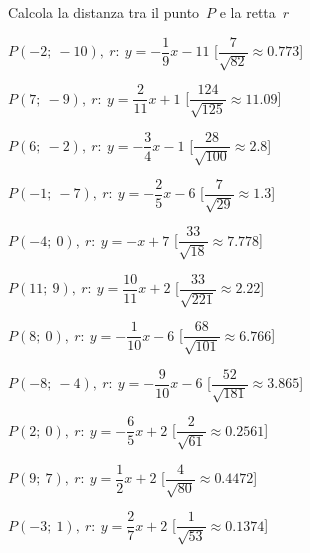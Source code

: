 \begin{esercizio}\label{ese:}
 Calcola la distanza tra il punto~\(P\) e la retta~\(r\)
 \begin{enumeratea}
  \item  \(P(-2;~-10),~r:~y = -\dfrac{1}{9} x -11\) \hfill 
   [\(\dfrac{7}{\sqrt{82}}\approx 0.773\)]
  \item  \(P(7;~-9),~r:~y = \dfrac{2}{11} x +1\) \hfill 
   [\(\dfrac{124}{\sqrt{125}}\approx 11.09\)]
  \item  \(P(6;~-2),~r:~y = -\dfrac{3}{4} x -1\) \hfill 
   [\(\dfrac{28}{\sqrt{100}}\approx   2.8\)]
  \item  \(P(-1;~-7),~r:~y = -\dfrac{2}{5} x -6\) \hfill 
   [\(\dfrac{7}{\sqrt{29}}\approx   1.3\)]
  \item  \(P(-4;~0),~r:~y = - x +7\) \hfill 
   [\(\dfrac{33}{\sqrt{18}}\approx 7.778\)]
  \item  \(P(11;~9),~r:~y = \dfrac{10}{11} x +2\) \hfill 
   [\(\dfrac{33}{\sqrt{221}}\approx  2.22\)]
  \item  \(P(8;~0),~r:~y = -\dfrac{1}{10} x -6\) \hfill 
   [\(\dfrac{68}{\sqrt{101}}\approx 6.766\)]
  \item  \(P(-8;~-4),~r:~y = -\dfrac{9}{10} x -6\) \hfill 
   [\(\dfrac{52}{\sqrt{181}}\approx 3.865\)]
  \item  \(P(2;~0),~r:~y = -\dfrac{6}{5} x +2\) \hfill 
   [\(\dfrac{2}{\sqrt{61}}\approx0.2561\)]
  \item  \(P(9;~7),~r:~y = \dfrac{1}{2} x +2\) \hfill 
   [\(\dfrac{4}{\sqrt{80}}\approx0.4472\)]
  \item  \(P(-3;~1),~r:~y = \dfrac{2}{7} x +2\) \hfill 
   [\(\dfrac{1}{\sqrt{53}}\approx0.1374\)]
 \end{enumeratea}
\end{esercizio}


